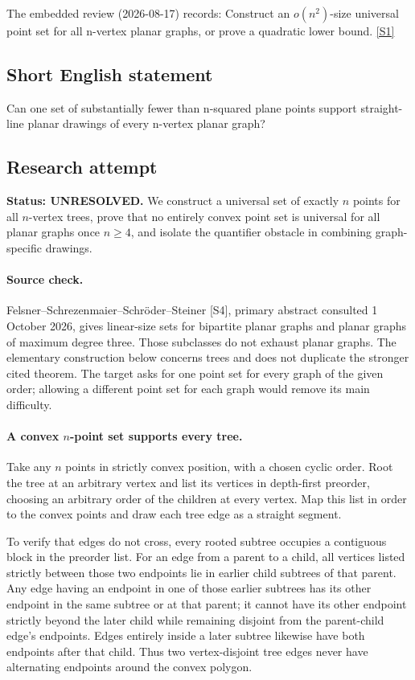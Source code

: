 \documentclass[11pt,a4paper]{article}
\newcommand{\sref}[2]{\hyperlink{source:#1:#2}{[S#2]}}
\begin{document}
The embedded review (2026-08-17) records: Construct an $o(n^2)$-size universal point set for all n-vertex planar graphs, or prove a quadratic lower bound. \sref{statement}{1}

\subsection{Short English statement}

Can one set of substantially fewer than n-squared plane points support straight-line planar drawings of every n-vertex planar graph?

\subsection{Research attempt}
\textbf{Status: UNRESOLVED.} We construct a universal set of exactly $n$ points for all $n$-vertex trees, prove that no entirely convex point set is universal for all planar graphs once $n\ge4$, and isolate the quantifier obstacle in combining graph-specific drawings.

\paragraph{Source check.}
Felsner--Schrezenmaier--Schr\"oder--Steiner [S4], primary abstract consulted 1 October 2026, gives linear-size sets for bipartite planar graphs and planar graphs of maximum degree three. Those subclasses do not exhaust planar graphs. The elementary construction below concerns trees and does not duplicate the stronger cited theorem. The target asks for one point set for every graph of the given order; allowing a different point set for each graph would remove its main difficulty.

\paragraph{A convex $n$-point set supports every tree.}
Take any $n$ points in strictly convex position, with a chosen cyclic order. Root the tree at an arbitrary vertex and list its vertices in depth-first preorder, choosing an arbitrary order of the children at every vertex. Map this list in order to the convex points and draw each tree edge as a straight segment.

To verify that edges do not cross, every rooted subtree occupies a contiguous block in the preorder list. For an edge from a parent to a child, all vertices listed strictly between those two endpoints lie in earlier child subtrees of that parent. Any edge having an endpoint in one of those earlier subtrees has its other endpoint in the same subtree or at that parent; it cannot have its other endpoint strictly beyond the later child while remaining disjoint from the parent-child edge's endpoints. Edges entirely inside a later subtree likewise have both endpoints after that child. Thus two vertex-disjoint tree edges never have alternating endpoints around the convex polygon.
\end{document}
